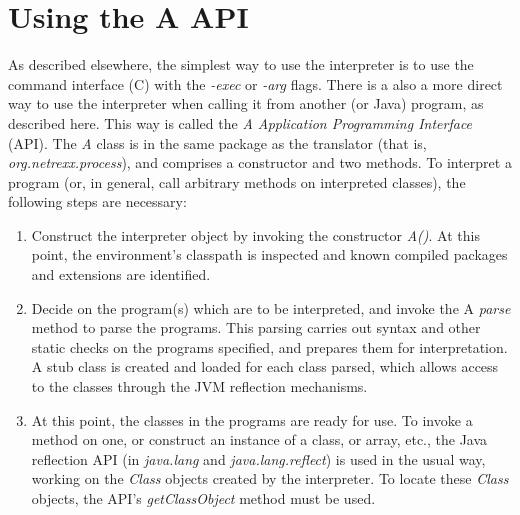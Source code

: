 \chapter{Using the \nr{}A API}\label{api}
As described elsewhere, the simplest way to use the \nr{} interpreter
is to use the command interface (\nr{}C) with the \emph{-exec}
or \emph{-arg} flags.
There is a also a more direct way to use the interpreter when calling it
from another \nr{} (or Java) program, as described here.  This
way is called the \emph{\nr{}A Application Programming Interface}
(API).
\newline
The \emph{\nr{}A} class is in the same package as the translator
(that is, \emph{org.netrexx.process}), and comprises a constructor
and two methods.  To interpret a \nr{} program (or, in general, call
arbitrary methods on interpreted classes), the following steps are
necessary:
\begin{enumerate}
\item Construct the interpreter object by invoking the constructor \emph{\nr{}A()}.
At this point, the environment's classpath is inspected and known
compiled packages and extensions are identified.
\item Decide on the program(s) which are to be interpreted, and invoke the
\nr{}A \emph{parse} method to parse the programs.  This parsing
carries out syntax and other static checks on the programs specified,
and prepares them for interpretation.  A stub class is created
and loaded for each class parsed, which allows access to the classes
through the JVM reflection mechanisms.
\item At this point, the classes in the programs are ready for use.  To invoke
a method on one, or construct an instance of a class, or array, etc.,
the Java reflection API (in \emph{java.lang} and \emph{java.lang.reflect})
is used in the usual way, working on the \emph{Class} objects created by
the interpreter.  To locate these \emph{Class} objects, the
API's \emph{getClassObject} method must be used.
\end{enumerate}

